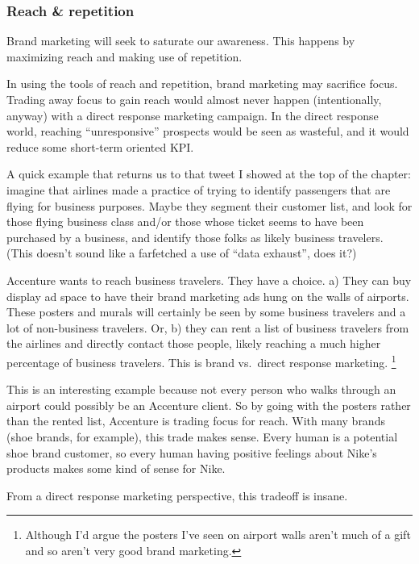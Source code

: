 \documentclass[13pt,]{tufte-handout}
\begin{document}
\hypertarget{reach-repetition}{%
\subsubsection{Reach \& repetition}\label{reach-repetition}}

Brand marketing will seek to saturate our awareness. This happens by
maximizing reach and making use of repetition.

In using the tools of reach and repetition, brand marketing may
sacrifice focus. Trading away focus to gain reach would almost never
happen (intentionally, anyway) with a direct response marketing
campaign. In the direct response world, reaching ``unresponsive''
prospects would be seen as wasteful, and it would reduce some short-term
oriented KPI.

A quick example that returns us to that tweet I showed at the top of the
chapter: imagine that airlines made a practice of trying to identify
passengers that are flying for business purposes. Maybe they segment
their customer list, and look for those flying business class and/or
those whose ticket seems to have been purchased by a business, and
identify those folks as likely business travelers. (This doesn't sound
like a farfetched a use of ``data exhaust'', does it?)

Accenture wants to reach business travelers. They have a choice. a) They
can buy display ad space to have their brand marketing ads hung on the
walls of airports. These posters and murals will certainly be seen by
some business travelers and a lot of non-business travelers. Or, b) they
can rent a list of business travelers from the airlines and directly
contact those people, likely reaching a much higher percentage of
business travelers. This is brand vs.~direct response marketing.
\footnote{Although I'd argue the posters I've seen on airport walls
  aren't much of a gift and so aren't very good brand marketing.}

This is an interesting example because not every person who walks
through an airport could possibly be an Accenture client. So by going
with the posters rather than the rented list, Accenture is trading focus
for reach. With many brands (shoe brands, for example), this trade makes
sense. Every human is a potential shoe brand customer, so every human
having positive feelings about Nike's products makes some kind of sense
for Nike.

From a direct response marketing perspective, this tradeoff is insane.
\end{document}
